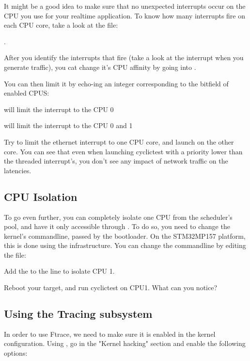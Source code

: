 It might be a good idea to make sure that no unexpected interrupts occur on the CPU
you use for your realtime application. To know how many interrupts fire on each CPU
core, take a look at the  file:

.

After you identify the interrupts that fire (take a look at the  interrupt
when you generate traffic), you cat change it's CPU affinity by going into .

You can then limit it by echo-ing an integer corresponding to the bitfield of enabled CPUS:

 will limit the interrupt to the CPU 0

 will limit the interrupt to the CPU 0 and 1

Try to limit the ethernet interrupt to one CPU core, and launch  on the
other core. You can see that even when launching cyclictest with a priority lower than
the threaded interrupt's, you don't see any impact of network traffic on the latencies.

\subsection{CPU Isolation}

To go even further, you can completely isolate one CPU from the scheduler's pool,
and have it only accessible through . To do so, you need to change
the kernel's commandline, passed by the bootloader. On the STM32MP157 platform,
this is done using the  infrastructure. You can change the
commandline by editing the  file:


Add the  to the  line to isolate CPU 1.

Reboot your target, and run cyclictest on CPU1. What can you notice?

\subsection{Using the Tracing subsystem}

In order to use Ftrace, we need to make sure it is enabled in the kernel
configuration. Using , go in the "Kernel hacking" section
and enable the following options:

